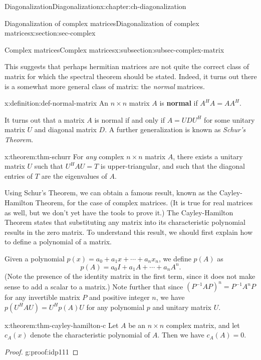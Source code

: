 \documentclass[oneside,10pt,]{book}
\newcommand{\terminology}[1]{\textbf{#1}}
\numberwithin{equation}{section}
\begin{document}
\begin{chapterptx}{Diagonalization}{}{Diagonalization}{}{}{x:chapter:ch-diagonalization}
\begin{sectionptx}{Diagonalization of complex matrices}{}{Diagonalization of complex matrices}{}{}{x:section:sec-complex}
\begin{subsectionptx}{Complex matrices}{}{Complex matrices}{}{}{x:subsection:subsec-complex-matrix}
\par
This suggests that perhaps hermitian matrices are not quite the correct class of matrix for which the spectral theorem should be stated. Indeed, it turns out there is a somewhat more general class of matrix: the \emph{normal} matrices.%
\begin{definition}{}{x:definition:def-normal-matrix}%
An \(n\times n\) matrix \(A\) is \terminology{normal} if \(A^HA = AA^H\).%
\end{definition}
It turns out that a matrix \(A\) is normal if and only if \(A=UDU^H\) for some unitary matrix \(U\) and diagonal matrix \(D\). A further generalization is known as \emph{Schur's Theorem}.%
\begin{theorem}{}{}{x:theorem:thm-schurr}%
For \emph{any} complex \(n\times n\) matrix \(A\), there exists a unitary matrix \(U\) such that \(U^HAU = T\) is upper-triangular, and such that the diagonal entries of \(T\) are the eigenvalues of \(A\).%
\end{theorem}
Using Schur's Theorem, we can obtain a famous result, known as the Cayley-Hamilton Theorem, for the case of complex matrices. (It is true for real matrices as well, but we don't yet have the tools to prove it.) The Cayley-Hamilton Theorem states that substituting any matrix into its characteristic polynomial results in the zero matrix. To understand this result, we should first explain how to define a polynomial of a matrix.%
\par
Given a polynomial \(p(x) = a_0+a_1x+\cdots + a_nx_n\), we define \(p(A)\) as%
\begin{equation*}
p(A) = a_0I+a_1A+\cdots + a_nA^n\text{.}
\end{equation*}
(Note the presence of the identity matrix in the first term, since it does not make sense to add a scalar to a matrix.) Note further that since \((P^{-1}AP)^n = P^{-1}A^nP\) for any invertible matrix \(P\) and positive integer \(n\), we have \(p(U^HAU)=U^Hp(A)U\) for any polynomial \(p\) and unitary matrix \(U\).%
\begin{theorem}{}{}{x:theorem:thm-cayley-hamilton-c}%
Let \(A\) be an \(n\times n\) complex matrix, and let \(c_A(x)\) denote the characteristic polynomial of \(A\). Then we have \(c_A(A)=0\).%
\end{theorem}
\begin{proof}{}{g:proof:idp111}

\end{proof}
\end{subsectionptx}
\end{sectionptx}
\end{chapterptx}
\end{document}
